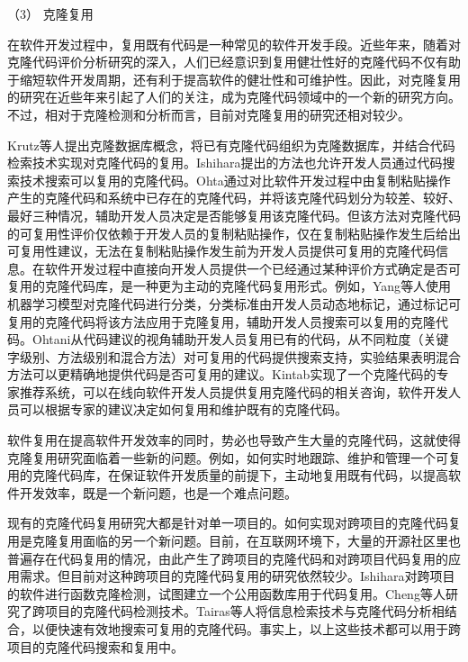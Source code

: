 （3） 克隆复用

在软件开发过程中，复用既有代码是一种常见的软件开发手段。近些年来，随着对克隆代码评价分析研究的深入，人们已经意识到复用健壮性好的克隆代码不仅有助于缩短软件开发周期，还有利于提高软件的健壮性和可维护性。因此，对克隆复用的研究在近些年来引起了人们的关注，成为克隆代码领域中的一个新的研究方向。不过，相对于克隆检测和分析而言，目前对克隆复用的研究还相对较少。

Krutz等人提出克隆数据库概念，将已有克隆代码组织为克隆数据库，并结合代码检索技术实现对克隆代码的复用\cite{krutz2014code}。Ishihara提出的方法也允许开发人员通过代码搜索技术搜索可以复用的克隆代码\cite{ishihara2013reusing}。Ohta通过对比软件开发过程中由复制粘贴操作产生的克隆代码和系统中已存在的克隆代码，并将该克隆代码划分为较差、较好、最好三种情况，辅助开发人员决定是否能够复用该克隆代码\cite{ohta2015source}。但该方法对克隆代码的可复用性评价仅依赖于开发人员的复制粘贴操作，仅在复制粘贴操作发生后给出可复用性建议，无法在复制粘贴操作发生前为开发人员提供可复用的克隆代码信息。在软件开发过程中直接向开发人员提供一个已经通过某种评价方式确定是否可复用的克隆代码库，是一种更为主动的克隆代码复用形式。例如，Yang\cite{yang2015classification}等人使用机器学习模型对克隆代码进行分类，分类标准由开发人员动态地标记，通过标记可复用的克隆代码将该方法应用于克隆复用，辅助开发人员搜索可以复用的克隆代码。Ohtani从代码建议的视角辅助开发人员复用已有的代码，从不同粒度（关键字级别、方法级别和混合方法）对可复用的代码提供搜索支持，实验结果表明混合方法可以更精确地提供代码是否可复用的建议\cite{ohtani2015level}。Kintab实现了一个克隆代码的专家推荐系统，可以在线向软件开发人员提供复用克隆代码的相关咨询，软件开发人员可以根据专家的建议决定如何复用和维护既有的克隆代码\cite{kintab2014recommending}。

软件复用在提高软件开发效率的同时，势必也导致产生大量的克隆代码，这就使得克隆复用研究面临着一些新的问题。例如，如何实时地跟踪、维护和管理一个可复用的克隆代码库，在保证软件开发质量的前提下，主动地复用既有代码，以提高软件开发效率，既是一个新问题，也是一个难点问题。

现有的克隆代码复用研究大都是针对单一项目的。如何实现对跨项目的克隆代码复用是克隆复用面临的另一个新问题。目前，在互联网环境下，大量的开源社区里也普遍存在代码复用的情况，由此产生了跨项目的克隆代码和对跨项目代码复用的应用需求。但目前对这种跨项目的克隆代码复用的研究依然较少。Ishihara对跨项目的软件进行函数克隆检测，试图建立一个公用函数库用于代码复用\cite{ishihara2012inter}。Cheng等人研究了跨项目的克隆代码检测技术\cite{cheng2016feasibility}。Tairas等人将信息检索技术与克隆代码分析相结合，以便快速有效地搜索可复用的克隆代码\cite{tairas2009information}。事实上，以上这些技术都可以用于跨项目的克隆代码搜索和复用中。

